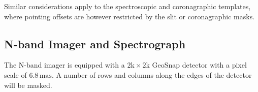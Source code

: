 Similar considerations apply to the spectroscopic and coronagraphic
templates, where pointing offsets are however restricted by the slit
or coronagraphic masks.


\subsection{N-band Imager and Spectrograph}
\label{ssec:instrument_data_N-IMG}

The N-band imager is equipped with a $2\mathrm{k}\times 2\mathrm{k}$
GeoSnap detector with a pixel scale of $6.8\,\mathrm{mas}$. A number
of rows and columns along the edges of the detector will be masked.

